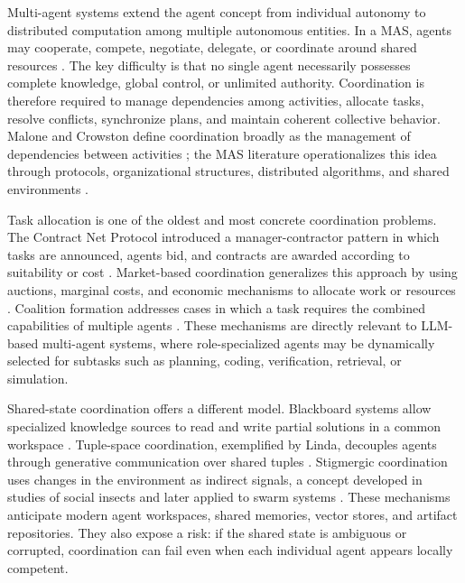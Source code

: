 Multi-agent systems extend the agent concept from individual autonomy to distributed computation among multiple autonomous entities. In a MAS, agents may cooperate, compete, negotiate, delegate, or coordinate around shared resources \cite{ferber1999multi,weiss2013multiagent,wooldridge2009introduction}. The key difficulty is that no single agent necessarily possesses complete knowledge, global control, or unlimited authority. Coordination is therefore required to manage dependencies among activities, allocate tasks, resolve conflicts, synchronize plans, and maintain coherent collective behavior. Malone and Crowston define coordination broadly as the management of dependencies between activities \cite{malone1994interdisciplinary}; the MAS literature operationalizes this idea through protocols, organizational structures, distributed algorithms, and shared environments \cite{jennings1996coordination}.

Task allocation is one of the oldest and most concrete coordination problems. The Contract Net Protocol introduced a manager-contractor pattern in which tasks are announced, agents bid, and contracts are awarded according to suitability or cost \cite{smith1980contract}. Market-based coordination generalizes this approach by using auctions, marginal costs, and economic mechanisms to allocate work or resources \cite{sandholm1993implementation,wellman1993market}. Coalition formation addresses cases in which a task requires the combined capabilities of multiple agents \cite{shehory1998methods}. These mechanisms are directly relevant to LLM-based multi-agent systems, where role-specialized agents may be dynamically selected for subtasks such as planning, coding, verification, retrieval, or simulation.

Shared-state coordination offers a different model. Blackboard systems allow specialized knowledge sources to read and write partial solutions in a common workspace \cite{nii1986blackboard,corkill1991blackboard}. Tuple-space coordination, exemplified by Linda, decouples agents through generative communication over shared tuples \cite{gelernter1985generative}. Stigmergic coordination uses changes in the environment as indirect signals, a concept developed in studies of social insects and later applied to swarm systems \cite{theraulaz1999brief}. These mechanisms anticipate modern agent workspaces, shared memories, vector stores, and artifact repositories. They also expose a risk: if the shared state is ambiguous or corrupted, coordination can fail even when each individual agent appears locally competent.

